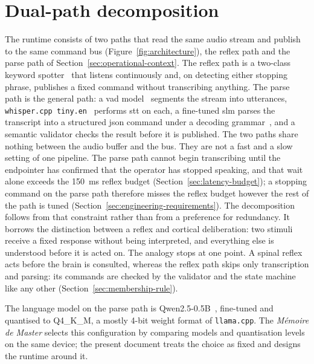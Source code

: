 \section{Dual-path decomposition}
\label{sec:dual-path}
The runtime consists of two paths that read the same audio stream and publish to the same command
bus (Figure~\ref{fig:architecture}), the reflex path and the parse path of
Section~\ref{sec:operational-context}. The reflex path is a two-class keyword spotter~\cite{oww}
that listens continuously and, on detecting either stopping phrase, publishes a fixed command
without transcribing anything. The parse path is the general path: a \gls{vad} model~\cite{silero}
segments the stream into utterances, \texttt{whisper.cpp tiny.en}~\cite{whisper,whispercpp} performs
\gls{stt} on each, a fine-tuned \gls{slm} parses the transcript into a structured \gls{json} command
under a decoding grammar~\cite{llamacpp}, and a semantic validator checks the result before it is
published.
The two paths share nothing between the audio buffer and the bus. They are not a fast and a slow
setting of one pipeline. The parse path cannot begin transcribing until the endpointer has
confirmed that the operator has stopped speaking, and that wait alone exceeds the 150~ms reflex
budget (Section~\ref{sec:latency-budget}); a stopping command on the parse path therefore misses
the reflex budget however the rest of the path is tuned (Section~\ref{sec:engineering-requirements}).
The decomposition follows from that constraint rather than from a preference for redundancy. It
borrows the distinction between a reflex and cortical deliberation: two stimuli receive a fixed
response without being interpreted, and everything else is understood before it is acted on. The
analogy stops at one point. A spinal reflex acts before the brain is consulted, whereas the reflex
path skips only transcription and parsing: its commands are checked by the validator and the state
machine like any other (Section~\ref{sec:membership-rule}).

The language model on the parse path is Qwen2.5-0.5B~\cite{qwen25}, fine-tuned and quantised to
Q4\_K\_M, a mostly 4-bit weight format of \texttt{llama.cpp}. The \emph{M\'emoire de Master}
selects this configuration by comparing models and quantisation levels on the same device; the
present document treats the choice as fixed and designs the runtime around it.

